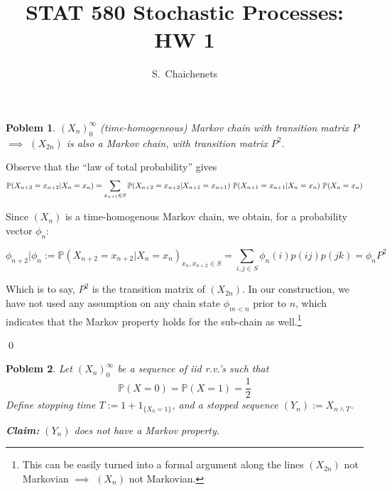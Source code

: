 \documentclass[8pt,notitlepage]{report}
\newtheorem{problem}{Poblem}
\newenvironment{solution}[1][Solution]{\begin{trivlist}
    \item[\hskip \labelsep {\bfseries #1}]}{\end{trivlist}}
\newcommand{\PP}{\mathbb{P}}
\begin{document}
\title{STAT 580 Stochastic Processes: HW 1}
\author{ S.\ Chaichenets }
\maketitle



\begin{problem}
	$(X_n)_0^\infty$ (time-homogeneous) Markov chain with transition matrix $P$  $\implies$
	$(X_{2n})$ is also a Markov chain, with transition matrix $P^2$.
\end{problem}

\begin{solution}

Observe that the ``law of total probability'' gives
\begin{equation}
\small
\PP(X_{n+2}=x_{n+2}|X_{n}=x_{n})
	=  
\sum_{x_{n+1} \in S} \PP(X_{n+2}=x_{n+2}|X_{n+1}=x_{n+1}) \ \PP(X_{n+1}=x_{n+1}|X_{n}=x_{n}) \ \PP(X_{n}=x_{n})
\end{equation}
\normalsize

Since $(X_n)$ is a time-homogenous Markov chain, we obtain, for a probability vector $\phi_n$:

\begin{equation}
\phi_{n+2} | \phi_{n} := 
\PP(X_{n+2}=x_{n+2}|X_{n}=x_{n})_{x_n,x_{n+2} \in S}
	= 
	\sum_{i,j \in S} \phi_n(i) p(ij) p(jk)
	= \phi_n P^2
\end{equation}

Which is to say, $P^2$ is the transition matrix of $(X_{2n})$. In our construction, 
we have not used any assumption on any chain state $\phi_{m < n}$ prior to $n$,
which indicates that the Markov property holds for the sub-chain 
as well.\footnote{This can be easily turned into a formal argument along the 
lines $(X_{2n})$ not Markovian $\implies$ $(X_n)$ not Markovian.}

\qed
\end{solution}


\begin{problem}
  Let $(X_n)_0^\infty$ be a sequence of iid r.v.'s such that $$ \PP(X=0) = \PP(X=1) = \frac{1}{2} $$
  Define stopping time $ T := 1 + 1_{\{X_0 = 1\} } $, and a stopped sequence $ (Y_n) := X_{n \wedge T} $.

  {\bf Claim:} $(Y_n)$ does not have a Markov property.
\end{problem}
\end{document}
